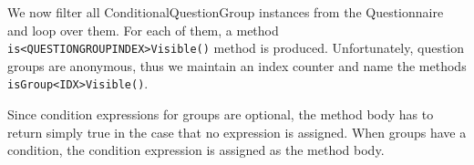 We now filter all ConditionalQuestionGroup instances from the Questionnaire and
loop over them. For each of them, a method \texttt{is<QUESTIONGROUPINDEX>Visible()}
method is produced. Unfortunately, question groups are anonymous, thus we
maintain an index counter and name the methods \texttt{isGroup<IDX>Visible()}.

Since condition expressions for groups are optional, the method body has to
return simply true in the case that no expression is assigned. When groups have
a condition, the condition expression is assigned as the method body.

